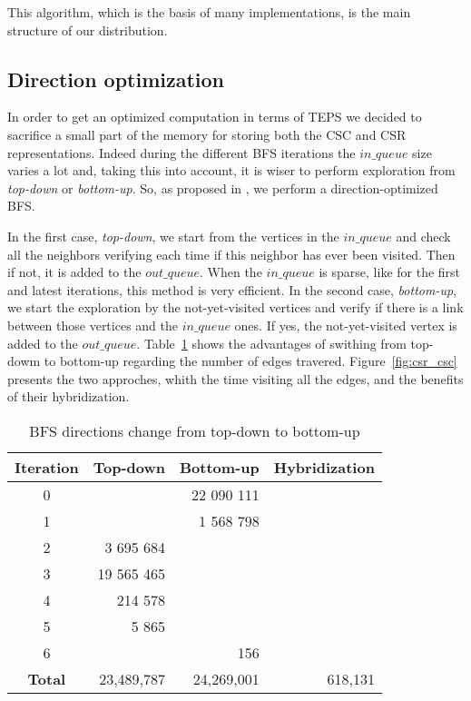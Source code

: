 This algorithm, which is the basis of many implementations, is the main structure of our distribution. 

\subsection{Direction optimization}

In order to get an optimized computation in terms of TEPS we decided to sacrifice a small part of the memory for storing both the CSC and CSR representations. 
Indeed during the different BFS iterations the $in\_queue$ size varies a lot and, taking this into account, it is wiser to perform exploration from \textit{top-down} or \textit{bottom-up}. 
So, as proposed in \cite{beamer2013direction}, we perform a direction-optimized BFS.

In the first case, \textit{top-down}, we start from the vertices in the $in\_queue$ and check all the neighbors verifying each time if this neighbor has ever been visited. 
Then if not, it is added to the $out\_queue$. 
When the $in\_queue$ is sparse, like for the first and latest iterations, this method is very efficient. 
In the second case, \textit{bottom-up}, we start the exploration by the not-yet-visited vertices and verify if there is a link between those vertices and the $in\_queue$ ones. 
If yes, the not-yet-visited vertex is added to the $out\_queue$. 
Table~\ref{table:direction_optimized} shows the advantages of swithing from top-dowm to bottom-up regarding the number of edges travered.
Figure~\ref{fig:csr_csc} presents the two approches, whith the time visiting all the edges, and the benefits of their hybridization.

\begin{table}[t!]
\centering
\begin{tabular}{c||r|r|r}
		\textbf{Iteration} & \textbf{Top-down} & \textbf{Bottom-up} & \textbf{Hybridization} \\ 
		\hline 
		\hline 
		0 & \color{red}{27} & 22 090 111 & \color{red}{27} \\ 
		1 & \color{red}{8 156} & 1 568 798 & \color{red}{8 156} \\ 
		\hline 
		2 & 3 695 684 & \color{blue}{587 893} & \color{blue}{587 893} \\ 
		3 & 19 565 465 & \color{blue}{12 586} & \color{blue}{12 586} \\ 
		4 & 214 578 & \color{blue}{8 256} & \color{blue}{8 256} \\ 
		5 & 5 865 & \color{blue}{1 201} & \color{blue}{1 201} \\ 
		\hline 
		6 & \color{red}{12} & 156 & \color{red}{12} \\ 
		\hline
		\textbf{Total} & 23,489,787 & 24,269,001 & 618,131 
\end{tabular} 
\caption{BFS directions change from top-down to bottom-up}	
\label{table:direction_optimized}
\end{table}

